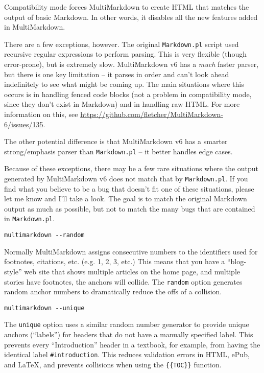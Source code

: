 Compatibility mode forces MultiMarkdown to create HTML that matches the output of basic Markdown. In other words, it disables all the new features added in MultiMarkdown.

There are a few exceptions, however. The original \texttt{Markdown.pl} script used recursive regular expressions to perform parsing. This is very flexible (though error-prone), but is extremely slow. MultiMarkdown v6 has a \emph{much} faster parser, but there is one key limitation -- it parses in order and can't look ahead indefinitely to see what might be coming up. The main situations where this occurs is in handling fenced code blocks (not a problem in compatibility mode, since they don't exist in Markdown) and in handling raw HTML. For more information on this, see \href{https://github.com/fletcher/MultiMarkdown-6/issues/135}{https:\slash \slash github.com\slash fletcher\slash MultiMarkdown-6\slash issues\slash 135}.

The other potential difference is that MultiMarkdown v6 has a smarter strong\slash emphasis parser than \texttt{Markdown.pl} -- it better handles edge cases.

Because of these exceptions, there may be a few rare situations where the output generated by MultiMarkdown v6 does not match that by \texttt{Markdown.pl}. If you find what you believe to be a bug that doesn't fit one of these situations, please let me know and I'll take a look. The goal is to match the original Markdown output as much as possible, but not to match the many bugs that are contained in \texttt{Markdown.pl}.

\begin{verbatim}
multimarkdown --random
\end{verbatim}

Normally MultiMarkdown assigns consecutive numbers to the identifiers used for footnotes, citations, etc. (e.g. 1, 2, 3, etc.) This means that you have a ``blog-style'' web site that shows multiple articles on the home page, and multiple stories have footnotes, the anchors will collide. The \texttt{random} option generates random anchor numbers to dramatically reduce the offs of a collision.

\begin{verbatim}
multimarkdown --unique
\end{verbatim}

The \texttt{unique} option uses a similar random number generator to provide unique anchors (``labels'') for headers that do not have a manually specified label. This prevents every ``Introduction'' header in a textbook, for example, from having the identical label \texttt{\#introduction}. This reduces validation errors in HTML, ePub, and LaTeX, and prevents collisions when using the \texttt{\{\{TOC\}\}} function.

